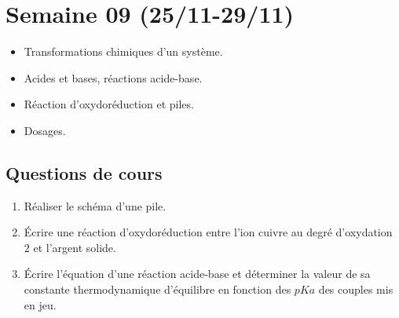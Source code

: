 \section{Semaine 09 (25/11-29/11) }


\begin{itemize}
	\item Transformations chimiques d'un système.
	\item Acides et bases, réactions acide-base.
	\item Réaction d'oxydoréduction et piles.
	\item Dosages.
\end{itemize}

\subsection{Questions de cours}

\begin{enumerate}
	\item Réaliser le schéma d'une pile. 
	\item Écrire une réaction d'oxydoréduction entre l'ion cuivre au degré d'oxydation $2$ et l'argent solide.
	\item Écrire l'équation d'une réaction acide-base et déterminer la valeur de sa constante thermodynamique d'équilibre en fonction des $pKa$ des couples mis en jeu.
\end{enumerate}

